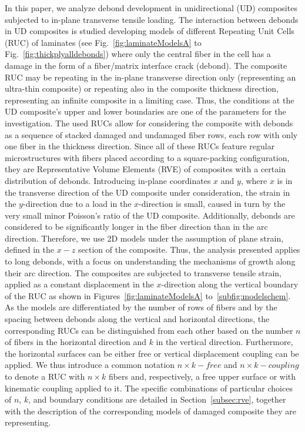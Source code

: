 \documentclass[review]{elsarticle}
\begin{document}
In this paper, we analyze debond development in unidirectional (UD) composites subjected to in-plane transverse tensile loading.  The interaction between debonds in UD composites is studied developing models of different Repeating Unit Cells (RUC) of laminates (see Fig.~\ref{fig:laminateModelsA} to Fig.~\ref{fig:thickplyalldebonds}) where only the central fiber in the cell has a damage in the form of a fiber/matrix interface crack (debond). The composite RUC may be repeating in the in-plane transverse direction only (representing an ultra-thin composite) or repeating also in the composite thickness direction, representing an infinite composite in a limiting case. Thus, the conditions at the UD composite's upper and lower boundaries are one of the parameters for the investigation.  The used RUCs allow for considering the composite with debonds as a sequence of stacked damaged and undamaged fiber rows, each row with only one fiber in the thickness direction. Since all of these RUCs feature regular microstructures with fibers placed according to a square-packing configuration, they are Representative Volume Elements (RVE) of composites with a certain distribution of debonds. Introducing in-plane coordinates $x$ and $y$, where $x$ is in the transverse direction of the UD composite under consideration, the strain in the $y$-direction due to a load in the $x$-direction is small, caused in turn by the very small minor Poisson's ratio of the UD composite. Additionally, debonds are considered to be significantly longer in the fiber direction than in the arc direction. Therefore, we use 2D models under the assumption of plane strain, defined in the $x-z$ section of the composite.  Thus, the analysis presented applies to long debonds, with a focus on understanding the mechanisms of growth along their arc direction. The composites are subjected to transverse tensile strain, applied as a constant displacement in the $x$-direction along the vertical boundary of the RUC as shown in  Figures~\ref{fig:laminateModelsA} to~\ref{subfig:modelschem}. As the models are differentiated by the number of rows of fibers and by the spacing between debonds along the vertical and horizontal directions, the corresponding RUCs can be distinguished from each other based on the number $n$ of fibers in the horizontal direction and $k$ in the vertical direction. Furthermore, the horizontal surfaces can be either free or vertical displacement coupling can be applied. We thus introduce a common notation $n\times k-free$  and $n\times k-coupling$ to denote a RUC with $n\times k$ fibers and, respectively, a free upper surface or with kinematic coupling applied to it. The specific combinations of particular choices of $n$, $k$, and boundary conditions are detailed in Section~\ref{subsec:rve}, together with the description of the corresponding models of damaged composite they are representing.
\end{document}
